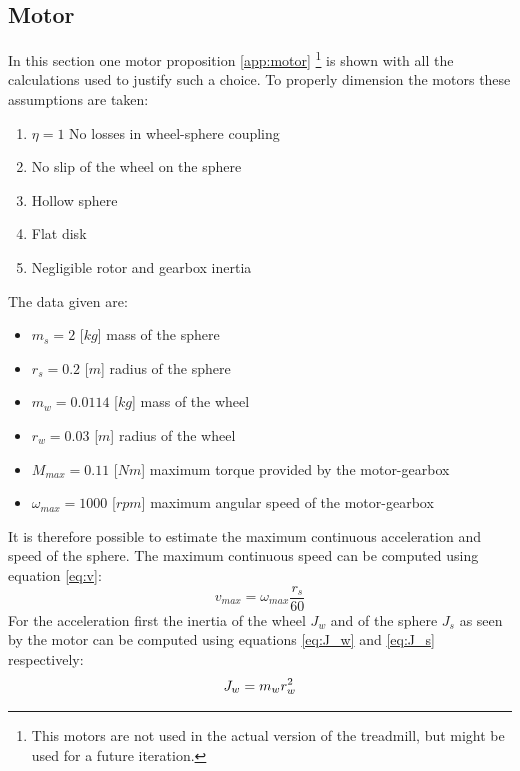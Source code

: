 \documentclass[12pt,a4paper, twoside]{article}
\begin{document}
\subsection{Motor}
In this section one motor proposition \ref{app:motor} \footnote{This motors are not used in the actual version of the treadmill, but might be used for a future iteration.} is shown with all the calculations used to justify such a choice.
To properly dimension the motors these assumptions are taken:
\begin{multicols}{2}[]
\begin{enumerate}
	\item $\eta = 1$ No losses in wheel-sphere coupling
	\item No slip of the wheel on the sphere
	\item Hollow sphere
	\item Flat disk
	\item Negligible rotor and gearbox inertia 
\end{enumerate}
\end{multicols}
\noindent
The data given are:
\begin{multicols}{2}[]
\begin{itemize}
	\item $m_s = 2$ [$kg$] mass of the sphere
	\item $r_s = 0.2$ [$m$] radius of the sphere
	\item $m_w = 0.0114$ [$kg$] mass of the wheel
	\item $r_w = 0.03$ [$m$] radius of the wheel
	\item $M_{max} = 0.11$ [$Nm$] maximum torque provided by the motor-gearbox 
	\item $\omega_{max} = 1000$ [$rpm$] maximum angular speed of the motor-gearbox
\end{itemize}
\end{multicols}
\noindent
It is therefore possible to estimate the maximum continuous acceleration and speed of the sphere.
The maximum continuous speed can be computed using equation \ref{eq:v}:
\begin{equation}\label{eq:v}
	v_{max} = \omega_{max}\frac{r_s}{60}
\end{equation} 
For the acceleration first the inertia of the wheel $J_w$ and of the sphere $J_s$ as seen by the motor can be computed using equations \ref{eq:J_w} and \ref{eq:J_s} respectively:
\begin{equation}\label{eq:J_w}
J_w = m_wr_w^2\\
\end{equation}
\end{document}
